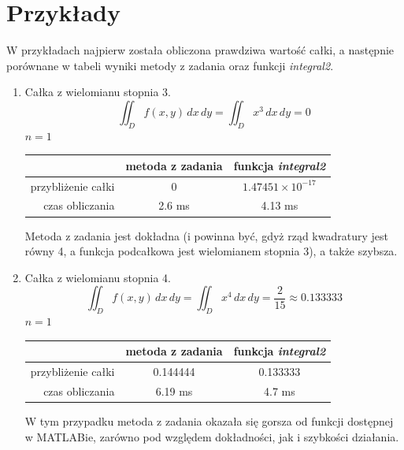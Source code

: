 \documentclass[12pt]{article}
\begin{document}
	
	
	
	\section{Przykłady}
	W przykładach najpierw została obliczona prawdziwa wartość całki, a następnie porównane w tabeli wyniki metody z zadania oraz funkcji \textit{integral2}.
	
	\begin{enumerate}[label=\textbf{Przykład \arabic*}]
		\item
		Całka z wielomianu stopnia 3.
		$$\iint_D f(x, y) \,dx\,dy = \iint_D x^3 \,dx\,dy = 0$$
		$n = 1$
		
		\begin{table}[H]
			\centering
			\begin{tabular}{|r|c|c|}
				\hline
				                   & metoda z zadania & funkcja \textit{integral2} \\ \hline
				przybliżenie całki &        0         & $1.47451 \times 10^{-17}$  \\ \hline
				   czas obliczania &      2.6 ms      &          4.13 ms           \\ \hline
			\end{tabular}
		\end{table}
	
		Metoda z zadania jest dokładna (i powinna być, gdyż rząd kwadratury jest równy 4, a funkcja podcałkowa jest wielomianem stopnia 3), a także szybsza.
		
		
		
		\item
		Całka z wielomianu stopnia 4.
		$$\iint_D f(x, y) \,dx\,dy = \iint_D x^4 \,dx\,dy = \frac{2}{15} \approx 0.133333$$
		$n = 1$
		
		\begin{table}[H]
			\centering
			\begin{tabular}{|r|c|c|}
				\hline
				                   & metoda z zadania & funkcja \textit{integral2} \\ \hline
				przybliżenie całki &     0.144444     &          0.133333          \\ \hline
				   czas obliczania &     6.19 ms      &           4.7 ms           \\ \hline
			\end{tabular}
		\end{table}
	
		W tym przypadku metoda z zadania okazała się gorsza od funkcji dostępnej w MATLABie, zarówno pod względem dokładności, jak i szybkości działania.
		

\end{enumerate}
\end{document}
